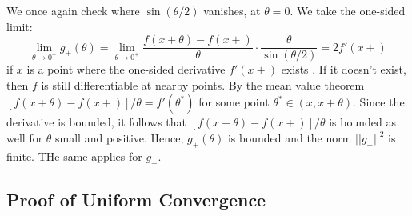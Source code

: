 \documentclass[12pt, a4paper, oneside, openright, titlepage]{book}
\begin{document}
We once again check where $\sin(\theta/2)$ vanishes, at $\theta = 0$. We take the one-sided limit: \begin{equation*}
    \lim\limits_{\theta\rightarrow 0^+}g_+(\theta) = \lim\limits_{\theta\rightarrow 0^+}\frac{f(x+\theta)-f(x+)}{\theta} \cdot \frac{\theta}{\sin(\theta/2)} = 2f'(x+)
\end{equation*}
if $x$ is a point where the one-sided derivative $f'(x+)$ exists . If it doesn't exist, then $f$ is still differentiable at nearby points. By the mean value theorem $[f(x+\theta)-f(x+)]/\theta = f'(\theta^*)$ for some point $\theta^* \in (x,x+\theta)$. Since the derivative is bounded, it follows that $[f(x+\theta)-f(x+)]/\theta$ is bounded as well for $\theta$ small and positive. Hence, $g_+(\theta)$ is bounded and the norm $||g_+||^2$ is finite. THe same applies for $g_-$.


\subsection{Proof of Uniform Convergence}
\end{document}
